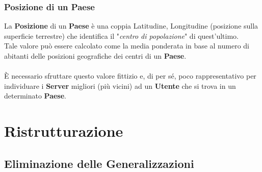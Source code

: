 \documentclass{article}
\begin{document}
\subsubsection{Posizione di un Paese}
La \textbf{Posizione} di un \textbf{Paese} è una coppia Latitudine, Longitudine (posizione sulla superficie terrestre) che identifica il "\textit{centro di popolazione}" di quest'ultimo. \\ 
Tale valore può essere calcolato come la media ponderata in base al numero di abitanti delle posizioni geografiche dei centri di un \textbf{Paese}. \\ \\
È necessario sfruttare questo valore fittizio e, di per sé, poco rappresentativo per individuare i \textbf{Server} migliori (più vicini) ad un \textbf{Utente} che si trova in un determinato \textbf{Paese}.

\newpage
\section{Ristrutturazione}

\subsection{Eliminazione delle Generalizzazioni}
\end{document}
